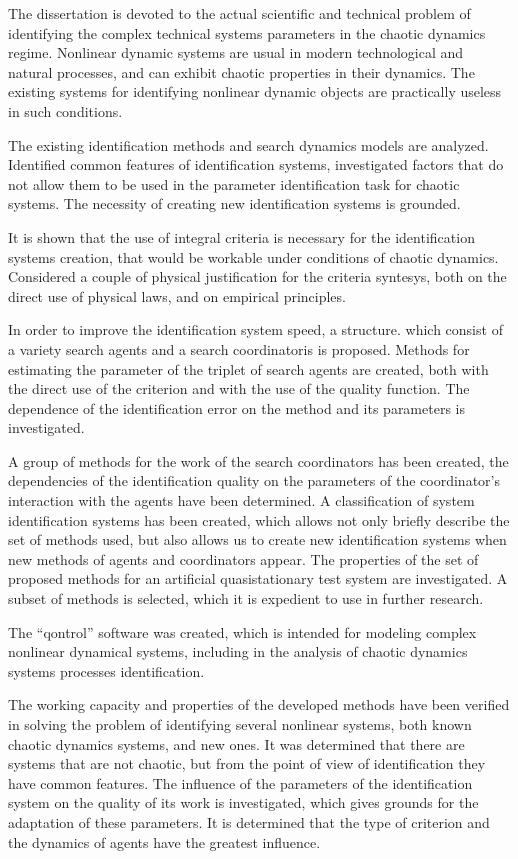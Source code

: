 \documentclass[a4paper,13pt]{atuaref}
\begin{document}
The dissertation is devoted to the actual scientific and technical problem of
identifying the complex technical systems parameters in the chaotic dynamics regime.
Nonlinear dynamic systems are usual in modern technological and natural processes,
and can exhibit chaotic properties in their dynamics.
The existing systems for identifying nonlinear dynamic objects are practically
useless in such conditions.

The existing identification methods and search dynamics models are analyzed.
Identified common features of identification systems, investigated factors that
do not allow them to be used in the parameter identification task for chaotic systems.
The necessity of creating new identification systems is grounded.

It is shown that the use of integral criteria is necessary
for the identification systems creation, that would be workable under conditions of chaotic
dynamics. Considered a couple of physical justification for the criteria syntesys,
both on the direct use of physical laws, and on empirical principles.

In order to improve the identification system speed,
a structure. which consist of a variety search agents and a search coordinatoris is proposed.
Methods for estimating the parameter of the triplet of search agents are created, both with
the direct use of the criterion and with the use of the quality function. The
dependence of the identification error on the method and its parameters is
investigated.

A group of methods for the work of the search coordinators has been created,
the dependencies of the identification quality on the parameters of the
coordinator's interaction with the agents have been determined. A
classification of system identification systems has been created, which allows
not only briefly describe the set of methods used, but also allows us to
create new identification systems when new methods of agents and coordinators
appear. The properties of the set of proposed methods for an artificial
quasistationary test system are investigated. A subset of methods is selected,
which it is expedient to use in further research.

The ``qontrol'' software was created, which is intended for modeling complex
nonlinear dynamical systems, including in the analysis of chaotic dynamics systems processes identification.

The working capacity and properties of the developed methods have been verified
in solving the problem of identifying several nonlinear systems, both known
chaotic dynamics systems, and new ones. It was determined that there are
systems that are not chaotic, but from the point of view of identification they
have common features. The influence of the parameters of the identification
system on the quality of its work is investigated, which gives grounds for the
adaptation of these parameters. It is determined that the type of criterion and
the dynamics of agents have the greatest influence.
\end{document}
